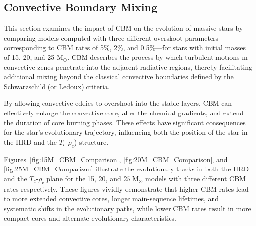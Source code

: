 \subsection{Convective Boundary Mixing}
This section examines the impact of CBM on the evolution of massive stars by comparing models computed with three different overshoot parameters—corresponding to CBM rates of 5\%, 2\%, and 0.5\%—for stars with initial masses of 15, 20, and 25 M$_\odot$. CBM describes the process by which turbulent motions in convective zones penetrate into the adjacent radiative regions, thereby facilitating additional mixing beyond the classical convective boundaries defined by the Schwarzschild (or Ledoux) criteria.

\vspace{1em}
\noindent
By allowing convective eddies to overshoot into the stable layers, CBM can effectively enlarge the convective core, alter the chemical gradients, and extend the duration of core burning phases. These effects have significant consequences for the star's evolutionary trajectory, influencing both the position of the star in the HRD and the \(T_c\)-\(\rho_c\)) structure.

\vspace{1em}
\noindent
Figures~\ref{fig:15M_CBM_Comparison}, \ref{fig:20M_CBM_Comparison}, and \ref{fig:25M_CBM_Comparison} illustrate the evolutionary tracks in both the HRD and the \(T_c\)-\(\rho_c\) plane for the 15, 20, and 25 M$_\odot$ models with three different CBM rates respectively. These figures vividly demonstrate that higher CBM rates lead to more extended convective cores, longer main-sequence lifetimes, and systematic shifts in the evolutionary paths, while lower CBM rates result in more compact cores and alternate evolutionary characteristics. 


